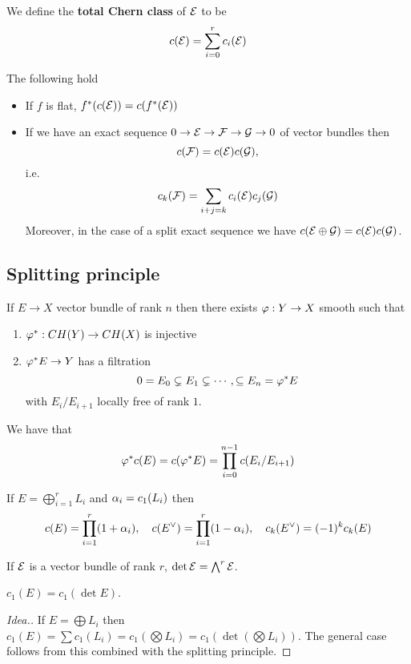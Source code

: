 \begin{definition}[]
We define the \textbf{total Chern class} of $\mathcal{E}$ to be
\[c(\mathcal{E})=\sum_{i=0}^rc_i(\mathcal{E})\]
\end{definition}

\begin{proposition}[]
The following hold
\begin{itemize}
\item If $f$ is flat, $f^\ast(c(\mathcal{E}))=c(f^\ast(\mathcal{E}))$
\item If we have an exact sequence $0\to \mathcal{E}\to \mathcal{F}\to \mathcal{G}\to 0$ of vector bundles then
\[c(\mathcal{F})=c(\mathcal{E})c(\mathcal{G}),\]
i.e.
\[c_k(\mathcal{F})=\sum_{i+j=k}c_i(\mathcal{E})c_j(\mathcal{G})\]
Moreover, in the case of a split exact sequence we have $c(\mathcal{E}\oplus \mathcal{G})=c(\mathcal{E})c(\mathcal{G})$.
\end{itemize}
\end{proposition}

\subsection{Splitting principle}

\begin{theorem}
If $E\to X$ vector bundle of rank $n$ then there exists $\varphi:Y\to X$ smooth such that 
\begin{enumerate}
    \item $\varphi^\ast:CH(Y)\to CH(X)$ is injective
    \item $\varphi^\ast E\to Y$ has a filtration
    \[0=E_0\subsetneq E_1\subsetneq\cdots, \subseteq E_n=\varphi^\ast E\]
    with $E_i/E_{i+1}$ locally free of rank $1$.
\end{enumerate}	
\end{theorem}


\begin{corollary}[]
We have that
\[\varphi^\ast c(E)=c(\varphi^\ast E)=\prod_{i=0}^{n-1} c(E_i/E_{i+1})\]
\end{corollary}

\begin{example}
If $E=\bigoplus_{i=1}^r L_i$ and $\alpha_i=c_1(L_i)$ then
\[c(E)=\prod_{i=1}^r(1+\alpha_i),\quad c(E^\vee)=\prod_{i=1}^r(1-\alpha_i),\quad c_k(E^\vee)=(-1)^kc_k(E)\]
\end{example}


\begin{definition}[]
If $\mathcal{E}$ is a vector bundle of rank $r$, $\det \mathcal{E}=\bigwedge^r\mathcal{E}$.
\end{definition}

\begin{proposition}[]
$c_1(E)=c_1(\det E)$.
\end{proposition}
\begin{proof}[Idea.]
If $E=\bigoplus L_i$ then $c_1(E)=\sum c_1(L_i)=c_1(\bigotimes L_i)=c_1(\det(\bigotimes L_i))$. The general case follows from this combined with the splitting principle.
\end{proof}















